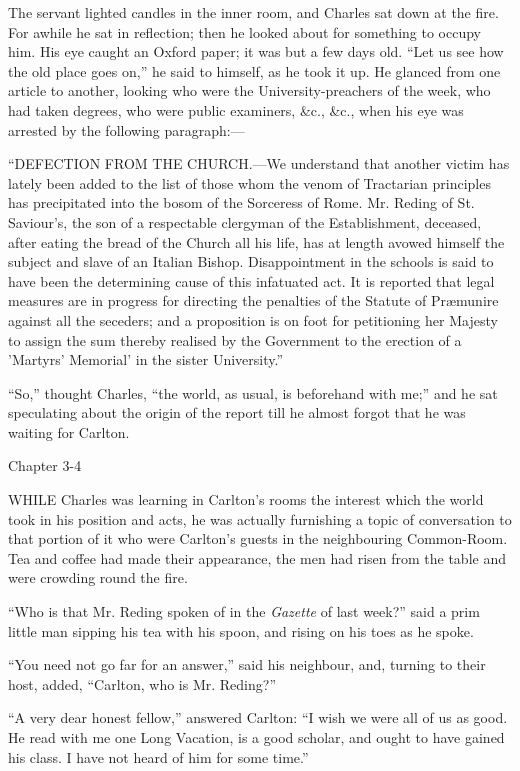 The servant lighted candles in the inner room, and Charles sat down
at the fire. For awhile he sat in reflection; then he looked about for
something to occupy him. His eye caught an Oxford paper; it was but a
few days old. ``Let us see how the old place goes on,''
he said to himself, as he took it up. He glanced from one article to
another, looking who were the University-preachers of the week, who
had taken degrees, who were public examiners, \&c., \&c., when
his eye was arrested by the following paragraph:—

``DEFECTION FROM THE
CHURCH.—We understand that another victim has
lately been added to the list of those whom the venom of Tractarian
principles has precipitated into the bosom of the Sorceress of Rome.
Mr. Reding of St. Saviour's, the son of a respectable clergyman of
the Establishment, deceased, after eating the bread of the Church all
his life, has at length avowed himself the subject and slave of an
Italian Bishop. Disappointment in the schools is said to have been the
determining cause of this infatuated act. It is reported that legal
measures are in progress for directing the penalties of the Statute of
Præmunire against all the seceders; and a proposition is on foot for
petitioning her Majesty to assign the sum thereby realised by the
Government to the erection of a 'Martyrs' Memorial' in the sister
University.''

``So,'' thought Charles, ``the world, as usual, is
beforehand with me;'' and he sat speculating about the origin of
the report till he almost forgot that he was waiting for Carlton.

Chapter 3-4


WHILE Charles was learning in Carlton's
rooms the interest which the world took in his position and acts, he
was actually furnishing a topic of conversation to that portion of it
who were Carlton's guests in the neighbouring Common-Room. Tea and
coffee had made their appearance, the men had risen from the table and
were crowding round the fire.

``Who is that Mr. Reding spoken of in the \emph{Gazette} of
last week?'' said a prim little man sipping his tea with his
spoon, and rising on his toes as he spoke.

``You need not go far for an answer,'' said his neighbour,
and, turning to their host, added, ``Carlton, who is Mr. Reding?''

``A very dear honest fellow,'' answered Carlton: ``I
wish we were all of us as good. He read with me one Long Vacation, is
a good scholar, and ought to have gained his class. I have not heard
of him for some time.''

